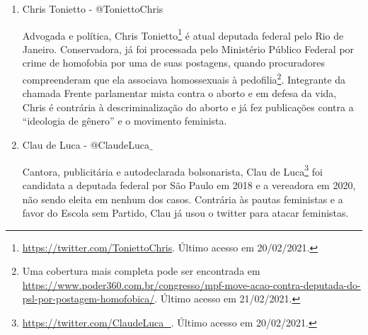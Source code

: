 \documentclass[
	12pt,				%
	openright,			%
	twoside,			%
	a4paper,			%
	english,			%
	brazil				%
	]{abntex2}
\begin{document}
\begin{anexosenv}
\begin{enumerate}
  \item Chris Tonietto - @ToniettoChris
  
  Advogada e política, Chris Tonietto\footnote{\url{https://twitter.com/ToniettoChris}. Último acesso em 20/02/2021.} é atual deputada federal pelo Rio de Janeiro. Conservadora, já foi processada pelo Ministério Público Federal por crime de homofobia por uma de suas postagens, quando procuradores compreenderam que ela associava homossexuais à pedofilia\footnote{Uma cobertura mais completa pode ser encontrada em \url{https://www.poder360.com.br/congresso/mpf-move-acao-contra-deputada-do-psl-por-postagem-homofobica/}. Último acesso em 21/02/2021.}. Integrante da chamada Frente parlamentar mista contra o aborto e em defesa da vida, Chris é contrária à descriminalização do aborto e já fez publicações contra a ``ideologia de gênero'' e o movimento feminista.
 
 
 
  
  \item Clau de Luca - @ClaudeLuca$\_$
  
  Cantora, publicitária e autodeclarada bolsonarista, Clau de Luca\footnote{\url{https://twitter.com/ClaudeLuca_}. Último acesso em 20/02/2021.} foi candidata a deputada federal por São Paulo em 2018 e a vereadora em 2020, não sendo eleita em nenhum dos casos. Contrária às pautas feministas e a favor do Escola sem Partido, Clau já usou o twitter para atacar feministas.
 

\end{enumerate}
\end{anexosenv}
\end{document}
